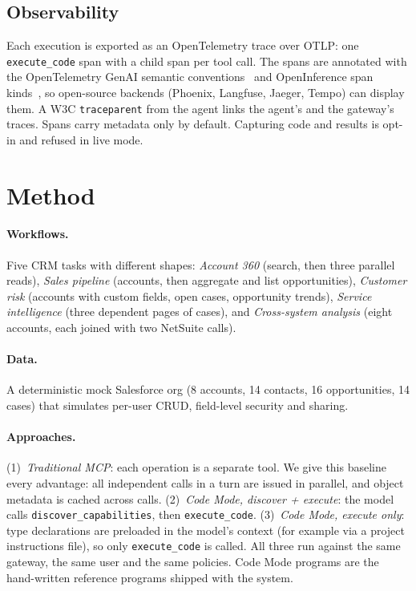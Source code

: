 \documentclass[11pt]{article}
\begin{document}
\subsection{Observability}
Each execution is exported as an OpenTelemetry trace over OTLP: one \texttt{execute\_code} span with a child span per tool call. The spans are annotated with the OpenTelemetry GenAI semantic conventions~\cite{otelgenai} and OpenInference span kinds~\cite{openinference}, so open-source backends (Phoenix, Langfuse, Jaeger, Tempo) can display them. A W3C \texttt{traceparent} from the agent links the agent's and the gateway's traces. Spans carry metadata only by default. Capturing code and results is opt-in and refused in live mode.

\section{Method}\label{sec:method}
\paragraph{Workflows.} Five CRM tasks with different shapes: \emph{Account 360} (search, then three parallel reads), \emph{Sales pipeline} (accounts, then aggregate and list opportunities), \emph{Customer risk} (accounts with custom fields, open cases, opportunity trends), \emph{Service intelligence} (three dependent pages of cases), and \emph{Cross-system analysis} (eight accounts, each joined with two NetSuite calls).
\paragraph{Data.} A deterministic mock Salesforce org (8 accounts, 14 contacts, 16 opportunities, 14 cases) that simulates per-user CRUD, field-level security and sharing.
\paragraph{Approaches.}
(1)~\emph{Traditional MCP}: each operation is a separate tool. We give this baseline every advantage: all independent calls in a turn are issued in parallel, and object metadata is cached across calls.
(2)~\emph{Code Mode, discover + execute}: the model calls \texttt{discover\_capabilities}, then \texttt{execute\_code}.
(3)~\emph{Code Mode, execute only}: type declarations are preloaded in the model's context (for example via a project instructions file), so only \texttt{execute\_code} is called.
All three run against the same gateway, the same user and the same policies. Code Mode programs are the hand-written reference programs shipped with the system.
\end{document}
